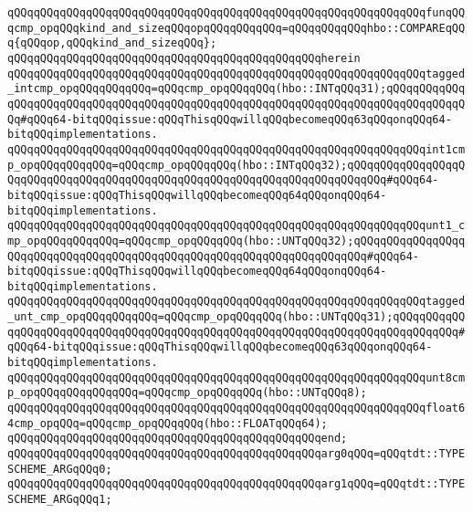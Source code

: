 \verb|qQQqqQQqqQQqqQQqqQQqqQQqqQQqqQQqqQQqqQQqqQQqqQQqqQQqqQQqqQQqqQQqfunqQQqcmp_opqQQqkind_and_sizeqQQqopqQQqqQQqqQQq=qQQqqQQqqQQqhbo::COMPAREqQQq{qQQqop,qQQqkind_and_sizeqQQq};|\newline
\verb|qQQqqQQqqQQqqQQqqQQqqQQqqQQqqQQqqQQqqQQqqQQqqQQqherein|\newline
\verb|qQQqqQQqqQQqqQQqqQQqqQQqqQQqqQQqqQQqqQQqqQQqqQQqqQQqqQQqqQQqqQQqtagged_intcmp_opqQQqqQQqqQQq=qQQqcmp_opqQQqqQQq(hbo::INTqQQq31);qQQqqQQqqQQqqQQqqQQqqQQqqQQqqQQqqQQqqQQqqQQqqQQqqQQqqQQqqQQqqQQqqQQqqQQqqQQqqQQqqQQq#qQQq64-bitqQQqissue:qQQqThisqQQqwillqQQqbecomeqQQq63qQQqonqQQq64-bitqQQqimplementations.|\newline
\verb|qQQqqQQqqQQqqQQqqQQqqQQqqQQqqQQqqQQqqQQqqQQqqQQqqQQqqQQqqQQqqQQqint1cmp_opqQQqqQQqqQQq=qQQqcmp_opqQQqqQQq(hbo::INTqQQq32);qQQqqQQqqQQqqQQqqQQqqQQqqQQqqQQqqQQqqQQqqQQqqQQqqQQqqQQqqQQqqQQqqQQqqQQqqQQq#qQQq64-bitqQQqissue:qQQqThisqQQqwillqQQqbecomeqQQq64qQQqonqQQq64-bitqQQqimplementations.|\newline
\newline
\verb|qQQqqQQqqQQqqQQqqQQqqQQqqQQqqQQqqQQqqQQqqQQqqQQqqQQqqQQqqQQqqQQqunt1_cmp_opqQQqqQQqqQQq=qQQqcmp_opqQQqqQQq(hbo::UNTqQQq32);qQQqqQQqqQQqqQQqqQQqqQQqqQQqqQQqqQQqqQQqqQQqqQQqqQQqqQQqqQQqqQQqqQQqqQQq#qQQq64-bitqQQqissue:qQQqThisqQQqwillqQQqbecomeqQQq64qQQqonqQQq64-bitqQQqimplementations.|\newline
\verb|qQQqqQQqqQQqqQQqqQQqqQQqqQQqqQQqqQQqqQQqqQQqqQQqqQQqqQQqqQQqqQQqtagged_unt_cmp_opqQQqqQQqqQQq=qQQqcmp_opqQQqqQQq(hbo::UNTqQQq31);qQQqqQQqqQQqqQQqqQQqqQQqqQQqqQQqqQQqqQQqqQQqqQQqqQQqqQQqqQQqqQQqqQQqqQQqqQQqqQQq#qQQq64-bitqQQqissue:qQQqThisqQQqwillqQQqbecomeqQQq63qQQqonqQQq64-bitqQQqimplementations.|\newline
\verb|qQQqqQQqqQQqqQQqqQQqqQQqqQQqqQQqqQQqqQQqqQQqqQQqqQQqqQQqqQQqqQQqunt8cmp_opqQQqqQQqqQQqqQQq=qQQqcmp_opqQQqqQQq(hbo::UNTqQQq8);|\newline
\newline
\verb|qQQqqQQqqQQqqQQqqQQqqQQqqQQqqQQqqQQqqQQqqQQqqQQqqQQqqQQqqQQqqQQqfloat64cmp_opqQQq=qQQqcmp_opqQQqqQQq(hbo::FLOATqQQq64);|\newline
\verb|qQQqqQQqqQQqqQQqqQQqqQQqqQQqqQQqqQQqqQQqqQQqqQQqend;|\newline
\newline
\newline
\verb|qQQqqQQqqQQqqQQqqQQqqQQqqQQqqQQqqQQqqQQqqQQqqQQqarg0qQQq=qQQqtdt::TYPESCHEME_ARGqQQq0;|\newline
\verb|qQQqqQQqqQQqqQQqqQQqqQQqqQQqqQQqqQQqqQQqqQQqqQQqarg1qQQq=qQQqtdt::TYPESCHEME_ARGqQQq1;|\newline
